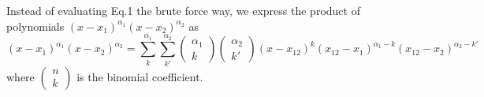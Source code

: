 \documentclass[prb]{revtex4}
\begin{document}
Instead of evaluating Eq.1 the brute force way, we express the product of
polynomials $(x-x_1)^{\alpha_1} (x-x_2)^{\alpha_2}$ as
\begin{equation}
  \label{eq:collocate:3}
  (x-x_1)^{\alpha_1} (x-x_2)^{\alpha_2} = \sum_{k}^{\alpha_1}\sum_{k'}^{\alpha_2}
  \left(
  \begin{array}{c}
    \alpha_1\\
    k
  \end{array}
  \right)
  \left(
  \begin{array}{c}
    \alpha_2\\
    k'
  \end{array}
  \right)
  (x-x_{12})^k (x_{12} - x_1)^{\alpha_1 - k}  (x_{12} - x_2)^{\alpha_2 - k'}
\end{equation}
where $\left(
\begin{array}{c}
  n\\
  k
\end{array}
\right)$ is the binomial coefficient.
\end{document}
